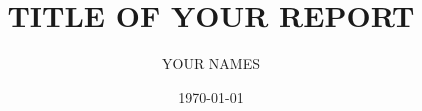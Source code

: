 \documentclass[letterpaper, 11pt]{article}
\newcommand{\1}{\mathds{1}}		%
\theoremstyle{definition}
\begin{document}

\title
{\normalsize\MakeUppercase
  {\bfseries 
    Title of your Report
  }
}
\author{\small\MakeUppercase
  {
    Your Names
  }
}

\date{\footnotesize\MakeUppercase\today}
\maketitle
\vspace{-1cm}





% 

\end{document}
